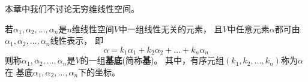 \begin{remark}
  本章中我们不讨论无穷维线性空间。
\end{remark}

\begin{definition}[基与坐标]
  若$\alpha_1,\alpha_2,\dots,\alpha_n$是$n$维线性空间$V$中一组线性无关的元素，
  且$V$中任意元素$\alpha$都可由$\alpha_1,\alpha_2,\dots,\alpha_n$线性表示，
  即\[ \alpha = k_1\alpha_1 + k_2\alpha_2 + \dots + k_n\alpha_n \]
  则称$\alpha_1,\alpha_2,\dots,\alpha_n$是$V$的一组\textbf{基底}(简称\textbf{基})。
  其中，有序元组$(k_1,k_2,\dots,k_n)$称为$\alpha$在
  基底$\alpha_1,\alpha_2,\dots,\alpha_n$下的坐标。
\end{definition}

